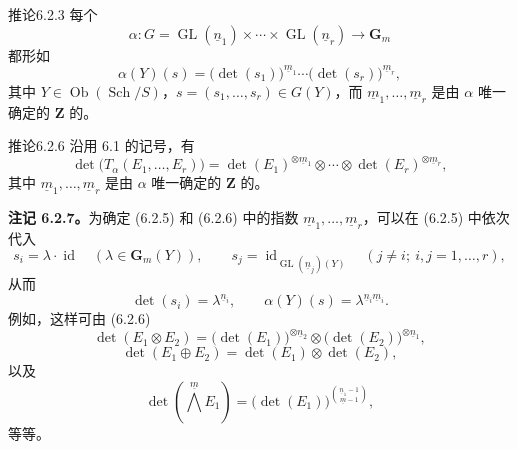 \begin{SGAresult}{推论}{6.2.3}
每个
\[
 \alpha:G=\operatorname{GL}(\underline n_1)\times\cdots\times
 \operatorname{GL}(\underline n_r)\longrightarrow\mathbf G_m\tag{6.2.4}
\]
都形如
\[
 \alpha(Y)(s)=\bigl(\det(s_1)\bigr)^{\underline m_1}\cdots
 \bigl(\det(s_r)\bigr)^{\underline m_r},\tag{6.2.5}
\]
其中 $Y\in\operatorname{Ob}(\operatorname{Sch}/S)$，$s=(s_1,\ldots,s_r)\in G(Y)$，而 $\underline m_1,\ldots,\underline m_r$ 是由 $\alpha$ 唯一确定的 $\mathbf Z$ 的。
\end{SGAresult}

\begin{SGAresult}{推论}{6.2.6}
沿用 6.1 的记号，有
\[
 \det\bigl(T_\alpha(E_1,\ldots,E_r)\bigr)=
 \det(E_1)^{\otimes\underline m_1}\otimes\cdots\otimes
 \det(E_r)^{\otimes\underline m_r},
\]
其中 $\underline m_1,\ldots,\underline m_r$ 是由 $\alpha$ 唯一确定的 $\mathbf Z$ 的。
\end{SGAresult}

\textbf{注记 6.2.7。}为确定 (6.2.5) 和 (6.2.6) 中的指数 $\underline m_1,\ldots,\underline m_r$，可以在 (6.2.5) 中依次代入
\[
 s_i=\lambda\cdot\operatorname{id}\quad(\lambda\in\mathbf G_m(Y)),
 \qquad s_j=\operatorname{id}_{\operatorname{GL}(\underline n_j)(Y)}
 \quad(j\ne i;\ i,j=1,\ldots,r),
\]
从而
\[
 \det(s_i)=\lambda^{\underline n_i},\qquad
 \alpha(Y)(s)=\lambda^{\underline n_i\underline m_i}.
\]
例如，这样可由 (6.2.6) 
\[
 \det(E_1\otimes E_2)=\bigl(\det(E_1)\bigr)^{\otimes\underline n_2}
 \otimes\bigl(\det(E_2)\bigr)^{\otimes\underline n_1},\tag{6.2.8}
\]
\[
 \det(E_1\oplus E_2)=\det(E_1)\otimes\det(E_2),\tag{6.2.9}
\]
以及
\[
 \det\left(\bigwedge^{\underline m}E_1\right)=
 \bigl(\det(E_1)\bigr)^{\binom{\underline n_1-1}{\underline m-1}},
 \tag{6.2.10}
\]
等等。

